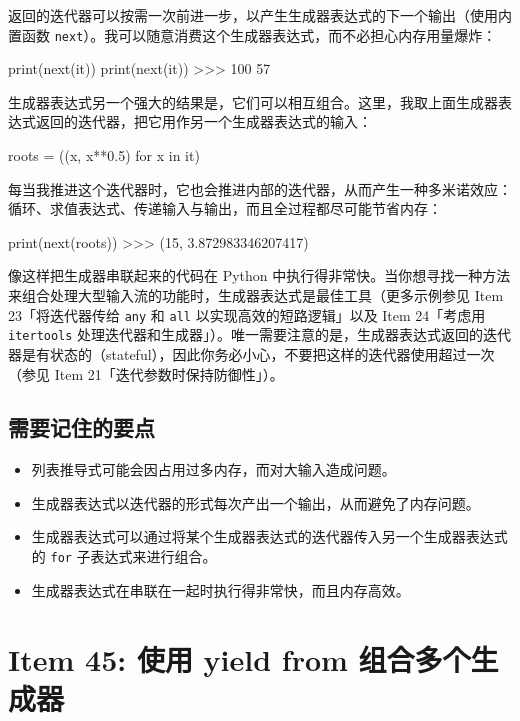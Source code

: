 返回的迭代器可以按需一次前进一步，以产生生成器表达式的下一个输出（使用内置函数 \texttt{next}）。我可以随意消费这个生成器表达式，而不必担心内存用量爆炸：

\begin{codebox}[python]
print(next(it))
print(next(it))
>>>
100
57
\end{codebox}

生成器表达式另一个强大的结果是，它们可以相互组合。这里，我取上面生成器表达式返回的迭代器，把它用作另一个生成器表达式的输入：

\begin{codebox}[python]
roots = ((x, x**0.5) for x in it)
\end{codebox}

每当我推进这个迭代器时，它也会推进内部的迭代器，从而产生一种多米诺效应：循环、求值表达式、传递输入与输出，而且全过程都尽可能节省内存：

\begin{codebox}[python]
print(next(roots))
>>>
(15, 3.872983346207417)
\end{codebox}

像这样把生成器串联起来的代码在 Python 中执行得非常快。当你想寻找一种方法来组合处理大型输入流的功能时，生成器表达式是最佳工具（更多示例参见 Item 23「将迭代器传给 \texttt{any} 和 \texttt{all} 以实现高效的短路逻辑」以及 Item 24「考虑用 \texttt{itertools} 处理迭代器和生成器」）。唯一需要注意的是，生成器表达式返回的迭代器是有状态的（stateful），因此你务必小心，不要把这样的迭代器使用超过一次（参见 Item 21「迭代参数时保持防御性」）。

\subsection{需要记住的要点}

\begin{itemize}
\item 列表推导式可能会因占用过多内存，而对大输入造成问题。
\item 生成器表达式以迭代器的形式每次产出一个输出，从而避免了内存问题。
\item 生成器表达式可以通过将某个生成器表达式的迭代器传入另一个生成器表达式的 \texttt{for} 子表达式来进行组合。
\item 生成器表达式在串联在一起时执行得非常快，而且内存高效。
\end{itemize}

\section{Item 45: 使用 yield from 组合多个生成器}

